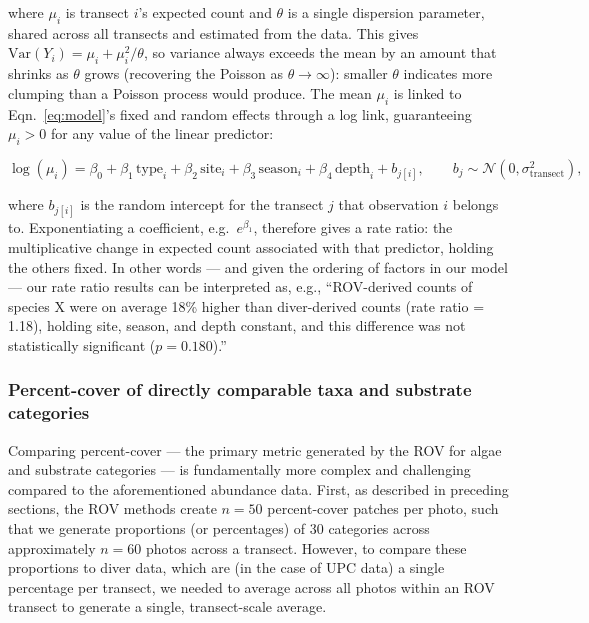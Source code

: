 \documentclass[11pt]{article}
\begin{document}
\noindent where $\mu_i$ is transect $i$'s expected count and $\theta$ is a
single dispersion parameter, shared across all transects and estimated from
the data.
This gives $\mathrm{Var}(Y_i) = \mu_i + \mu_i^2/\theta$, so variance always
exceeds the mean by an amount that shrinks as $\theta$ grows (recovering the
Poisson as $\theta \to \infty$): smaller $\theta$ indicates more clumping than
a Poisson process would produce.
%
The mean $\mu_i$ is linked to Eqn.~\ref{eq:model}'s fixed and random
effects through a log link, guaranteeing $\mu_i > 0$ for any value of the
linear predictor:

\begin{equation}
\log(\mu_i) 
= 
\beta_0 
+ \beta_1\, \mathrm{type}_i 
+ \beta_2\, \mathrm{site}_i 
+ \beta_3\, \mathrm{season}_i 
+ \beta_4\, \mathrm{depth}_i 
+ b_{j[i]},
\qquad
b_{j} \sim \mathcal{N}(0, \sigma^2_{\mathrm{transect}}),
\label{eq:negbinom-link}
\end{equation}

where $b_{j[i]}$ is the random intercept for the transect $j$ that 
observation $i$ belongs to. 
%
Exponentiating a coefficient, e.g.\ $e^{\beta_1}$, therefore gives a 
rate ratio: the multiplicative change in expected count associated with that 
predictor, holding the others fixed.
In other words --- and given the ordering of factors in our model --- our rate 
ratio results can be interpreted as, e.g., ``ROV-derived counts of species X 
were on average 18\% higher than diver-derived counts (rate ratio = 1.18), 
holding site, season, and depth constant, and this difference was not
statistically significant ($p=0.180$).''

\subsubsection{Percent-cover of directly comparable taxa and substrate 
categories}
\label{subsubsec:percent-cover}

Comparing percent-cover --- the primary metric generated by the ROV for algae 
and substrate categories --- is fundamentally more complex and challenging 
compared to the aforementioned abundance data. 
First, as described in preceding sections, the ROV methods create $n=50$ 
percent-cover patches per photo, such that we generate proportions (or 
percentages) of 30 categories across approximately $n=60$ photos across a 
transect.  
However, to compare these proportions to diver data, which are (in the case of 
UPC data) a single percentage per transect, we needed to average across all 
photos within an ROV transect to generate a single, transect-scale average. 
\end{document}
